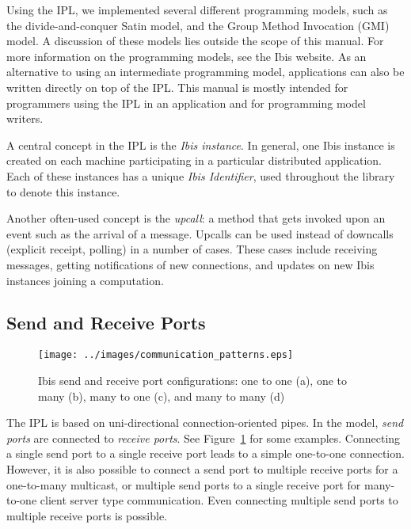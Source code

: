\documentclass[10pt]{article}
\begin{document}
Using the IPL, we implemented several different programming models, such
as the divide-and-conquer Satin model, and the Group Method
Invocation (GMI) model. A discussion of these models lies outside the
scope of this manual. For more information on the programming models,
see the Ibis website. As an alternative to using an intermediate
programming model, applications can also be written directly on top of
the IPL. This manual is mostly intended for programmers using
the IPL in an application and for programming model writers.

A central concept in the IPL is the \emph{Ibis instance}. In general,
one Ibis instance is created on each machine participating in a
particular distributed application. Each of these instances has a unique
\emph{Ibis Identifier}, used throughout the library to denote this
instance.

Another often-used concept is the \emph{upcall}: a method that gets invoked
upon an event such as the arrival of a message. Upcalls can be used
instead of downcalls (explicit receipt, polling) in a number of cases.
These cases include receiving messages, getting notifications of new
connections, and updates on new Ibis instances joining a computation.

\subsection{Send and Receive Ports}


\begin{figure}[t] \centering
\texttt{[image: ../images/communication\_patterns.eps]}
\caption{\label{ports}Ibis send and receive port configurations: one to one (a), one to many (b), many to one (c), and many to many (d)}
\end{figure}

The IPL is based on uni-directional connection-oriented pipes. In the
model, \emph{send ports} are connected to \emph{receive ports}. See
Figure~\ref{ports} for some examples. Connecting a single send port to a
single receive port leads to a simple one-to-one connection. However, it is
also possible to connect a send port to multiple receive ports for a
one-to-many multicast, or multiple send ports to a single receive port
for many-to-one client server type communication. Even connecting
multiple send ports to multiple receive ports is possible.
\end{document}
